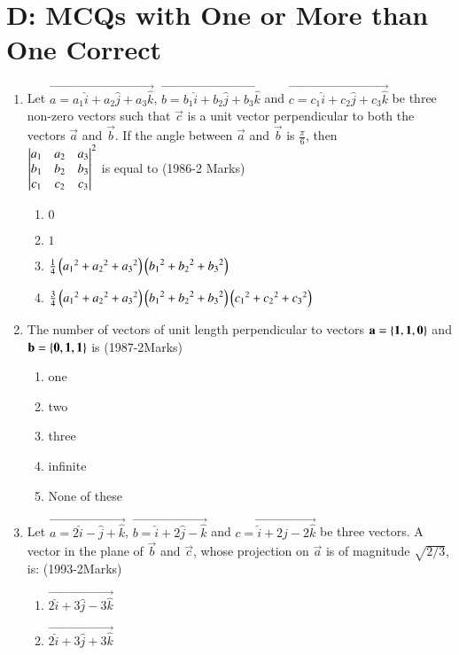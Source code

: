 \documentclass[journal,12pt,twocolumn]{IEEEtran}
\theoremstyle{remark}
\begin{document}
 \section{D: MCQs with One or More than One Correct}
\begin{enumerate}
	\item %
		Let $\vec{a=a_1\hat{i}+a_2\hat{j}+a_3\hat{k}}$, $\vec{b=b_1\hat{i}+b_2\hat{j}+b_3\hat{k}}$ and $\vec{c=c_1\hat{i}+c_2\hat{j}+c_3\hat{k}}$ be three non-zero vectors such that $\vec{c}$ is a unit vector perpendicular to both the vectors $\vec{a}$ and $\vec{b}$. If the angle between $\vec{a}$ and $\vec{b}$ is $\frac{\pi}{6}$, then \\
$
	\begin{vmatrix}
a_1 & a_2 & a_3 \\
b_1 & b_2 & b_3 \\
c_1 & c_2 & c_3
\end{vmatrix}^2
$
 is equal to \hfill{(1986-2 Marks)}\\
		\begin{enumerate}
			\item $0$
			\item $1$
			\item $\frac{1}{4}\left({a_1}^2+{a_2}^2+{a_3}^2\right)\left({b_1}^2+{b_2}^2+{b_3}^2\right)$
			\item $\frac{3}{4}\left({a_1}^2+{a_2}^2+{a_3}^2\right)\left({b_1}^2+{b_2}^2+{b_3}^2\right)\left({c_1}^2+{c_2}^2+{c_3}^2\right)$
		\end{enumerate}
\item %
	The number of vectors of unit length perpendicular to vectors $\mathbf{a=\left\{1,1,0\right\}}$ and $\mathbf{b=\left\{0,1,1\right\}}$ is \hfill{(1987-2Marks)}\\
		\begin{enumerate}
			\item one
		        \item two
			\item three
			\item infinite
			\item None of these
		\end{enumerate}
\item %
	Let $\vec{a=2\hat{i}-\hat{j}+\hat{k}}$, $\vec{b=\hat{i}+2\hat{j}-\hat{k}}$ and $\vec{c=\hat{i}+2\hat{j}-2\hat{k}}$ be three vectors. A vector in the plane of $\vec{b}$ and $\vec{c}$, whose projection on $\vec{a}$ is of magnitude $\sqrt{2/3}$, is: \hfill{(1993-2Marks)}\\
		\begin{enumerate}
			\item $\vec{2\hat{i}+3\hat{j}-3\hat{k}}$
			\item $\vec{2\hat{i}+3\hat{j}+3\hat{k}}$

\end{enumerate}
\end{enumerate}
\end{document}
